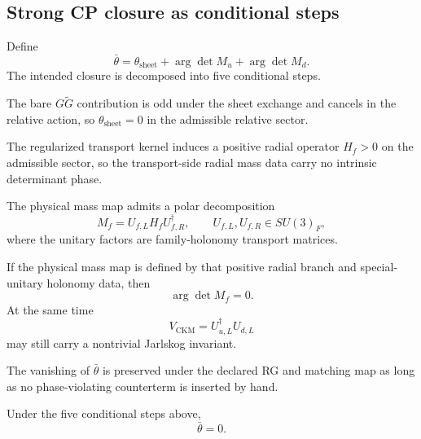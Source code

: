 \subsection{Strong CP closure as conditional steps}

Define
\begin{equation}
\label{eq:strong-cp}
\bar\theta=\theta_{\mathrm{sheet}}+\arg\det M_u+\arg\det M_d.
\end{equation}
The intended closure is decomposed into five conditional steps.

\begin{conditionalstep}
The bare $G\widetilde G$ contribution is odd under the sheet exchange and cancels in the relative action, so $\theta_{\mathrm{sheet}}=0$ in the admissible relative sector.
\end{conditionalstep}

\begin{conditionalstep}
The regularized transport kernel induces a positive radial operator $H_f>0$ on the admissible sector, so the transport-side radial mass data carry no intrinsic determinant phase.
\end{conditionalstep}

\begin{conditionalstep}
The physical mass map admits a polar decomposition
\[
M_f=U_{f,L}H_fU_{f,R}^\dagger,
\qquad
U_{f,L},U_{f,R}\in SU(3)_F,
\]
where the unitary factors are family-holonomy transport matrices.
\end{conditionalstep}

\begin{conditionalstep}
If the physical mass map is defined by that positive radial branch and special-unitary holonomy data, then
\[
\arg\det M_f=0.
\]
At the same time
\[
V_{\mathrm{CKM}}=U_{u,L}^\dagger U_{d,L}
\]
may still carry a nontrivial Jarlskog invariant.
\end{conditionalstep}

\begin{conditionalstep}[RG preservation]
The vanishing of $\bar\theta$ is preserved under the declared RG and matching map as long as no phase-violating counterterm is inserted by hand.
\end{conditionalstep}

\begin{conjecture}
Under the five conditional steps above,
\[
\bar\theta=0.
\]
\end{conjecture}

